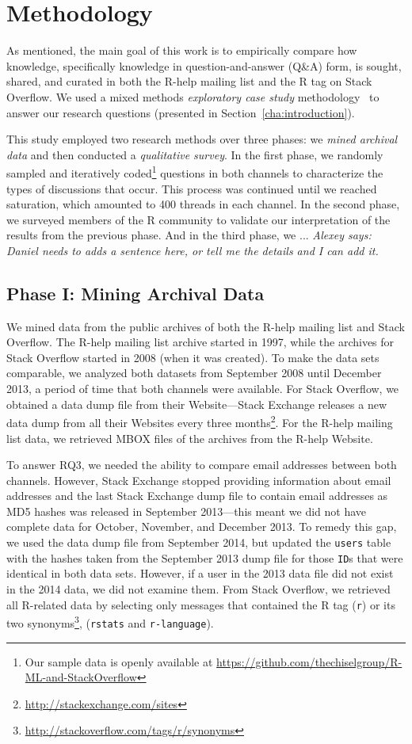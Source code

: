 \documentclass[smallextended]{svjour3}       %
\newcommand{\alexey}[1]{{\color{cyan}\emph{Alexey says: #1}}\xspace}
\newcommand{\alexey}[1]{}
\newcommand{\SO}{Stack Overflow\xspace}
\newcommand{\RH}{R-help\xspace}
\begin{document}
\section{Methodology}
\label{cha:methodology}

As mentioned, the main goal of this work is to empirically compare how
knowledge, specifically knowledge in question-and-answer (Q\&A) form,
is sought, shared, and curated in both the \RH mailing list and the R
tag on \SO. We used a mixed methods \textit{exploratory case study}
methodology~\cite{Creswell2009,Runeson2012} to answer our research
questions (presented in Section~\ref{cha:introduction}).
                    
This study employed two research methods over three phases: we
\textit{mined archival data} and then conducted a \textit{qualitative
  survey}. In the first phase, we randomly sampled and iteratively
coded\footnote{Our sample data is openly available at
  \url{https://github.com/thechiselgroup/R-ML-and-StackOverflow}}
questions in both channels to characterize the types of discussions
that occur. This process was continued until we reached saturation,
which amounted to 400 threads in each channel. In the second phase, we
surveyed members of the R community to validate our interpretation of
the results from the previous phase. And in the third phase, we ... \alexey{Daniel needs to adds a sentence here, or tell me the details and I can add it.}

\subsection{Phase I: Mining Archival Data} 
\label{sec:studyDesign}

We mined data from the public archives of both the \RH mailing list and \SO. The \RH mailing list archive started in 1997, while the archives for \SO started in 2008 (when it was created).
To make the data sets comparable, we analyzed both datasets from September 2008 until December 2013, a period of time that both channels were available.
For \SO, we obtained a data dump file from their Website---Stack Exchange releases a new data dump from all their Websites every three months\footnote{\url{http://stackexchange.com/sites}}. For the \RH mailing list data, we retrieved MBOX files of the archives from the \RH Website.

To answer RQ3, we needed the ability to compare email addresses
between both channels. However, Stack Exchange stopped providing
information about email addresses and the last Stack Exchange dump
file to contain email addresses as MD5 hashes was released in
September 2013---this meant we did not have complete data for October,
November, and December 2013.  To remedy this gap, we used the data
dump file from September 2014, but updated the \texttt{users} table
with the hashes taken from the September 2013 dump file for those
\texttt{ID}s that were identical in both data sets.  However, if a
user in the 2013 data file did not exist in the 2014 data, we did not
examine them.  From \SO, we retrieved all R-related data by selecting
only messages that contained the R tag (\texttt{r}) or its two
synonyms\footnote{\url{http://stackoverflow.com/tags/r/synonyms}},
(\texttt{rstats} and \texttt{r-language}).
\end{document}
